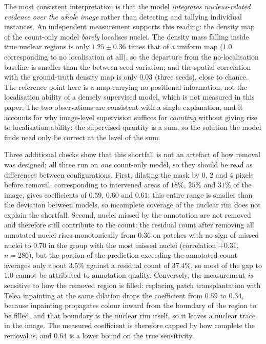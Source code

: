 \documentclass[pdflatex,sn-mathphys-num]{sn-jnl}
\begin{document}
The most consistent interpretation is that the model \emph{integrates nucleus-related evidence over the whole
image} rather than detecting and tallying individual instances. An independent measurement supports this
reading: the density map of the count-only model \emph{barely} localises nuclei. The density mass falling
inside true nuclear regions is only $1.25\pm0.36$ times that of a uniform map ($1.0$ corresponding to no
localisation at all), so the departure from the no-localisation baseline is smaller than the between-seed
variation; and the spatial correlation with the ground-truth density map is only $0.03$ (three seeds), close to
chance. The reference point here is a map carrying no positional information, not the localisation ability of a
densely supervised model, which is not measured in this paper. The two observations are consistent with a
single explanation, and it accounts for why image-level supervision suffices for \emph{counting} without giving
rise to localisation ability: the supervised quantity is a sum, so the solution the model finds need only be
correct at the level of the sum.

Three additional checks show that this shortfall is not an artefact of how removal was designed; all three run
on \emph{one} count-only model, so they should be read as differences between configurations. First, dilating the mask by $0$, $2$ and $4$ pixels before removal, corresponding to
intervened areas of $18\%$, $25\%$ and $31\%$ of the image, gives coefficients of $0.59$, $0.60$ and $0.61$;
this entire range is smaller than the deviation between models, so incomplete coverage of the nuclear rim does
not explain the shortfall. Second, nuclei missed by the annotation are not removed and therefore still
contribute to the count: the residual count after removing all annotated nuclei rises monotonically from $0.36$
on patches with no sign of missed nuclei to $0.70$ in the group with the most missed nuclei (correlation
$+0.31$, $n = 286$), but the portion of the prediction exceeding the annotated count averages only about
$3.5\%$ against a residual count of $37.4\%$, so most of the gap to $1.0$ cannot be attributed to annotation
quality. Conversely, the measurement \emph{is} sensitive to how the removed region is filled: replacing patch
transplantation with Telea inpainting at the same dilation drops the coefficient from $0.59$ to $0.34$, because
inpainting propagates colour inward from the boundary of the region to be filled, and that boundary is the
nuclear rim itself, so it leaves a nuclear trace in the image. The measured coefficient is therefore capped by
how complete the removal is, and $0.64$ is a lower bound on the true sensitivity.
\end{document}
